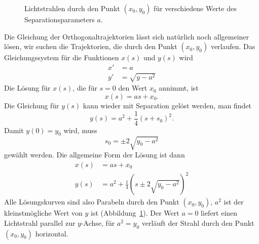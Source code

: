 \begin{diskussion}
\begin{figure}
\centering
{}
\caption{Lichtstrahlen durch den Punkt $(x_0,y_0)$ für verschiedene
Werte des Separationsparameters $a$.
\label{40000008:fata}}
\end{figure}
Die Gleichung der Orthogonaltrajektorien lässt sich natürlich noch
allgemeiner lösen, wir suchen die Trajektorien, die durch den Punkt
$(x_0,y_0)$ verlaufen.
Das Gleichungssystem für die Funktionen $x(s)$ und $y(s)$ wird
\begin{align*}
x'&=a\\
y'&=\sqrt{y-a^2}
\end{align*}
Die Lösung für $x(s)$, die für $s=0$ den Wert $x_0$ annimmt, ist
\[
x(s)=as+x_0.
\]
Die Gleichung für $y(s)$ kann wieder mit Separation gelöst werden,
man findet
\[
y(s)=a^2+\frac14(s+s_0)^2.
\]
Damit $y(0)=y_0$ wird, muss 
\[
s_0=\pm 2\sqrt{y_0-a^2}
\]
gewählt werden.
Die allgemeine Form der Lösung ist dann
\begin{align*}
x(s)&=as+x_0
\\
y(s)&=a^2 + \frac14\left(s\pm2\sqrt{y_0-a^2}\right)^2
\end{align*}
Alle Lösungskurven sind also Parabeln durch den Punkt $(x_0,y_0)$,
$a^2$ ist der kleinstmögliche Wert von $y$ ist (Abbildung~\ref{40000008:fata}).
Der Wert $a=0$ liefert einen Lichtstrahl parallel zur $y$-Achse, für $a^2=y_0$
verläuft der Strahl durch den Punkt $(x_0,y_0)$ horizontal.
\end{diskussion}

